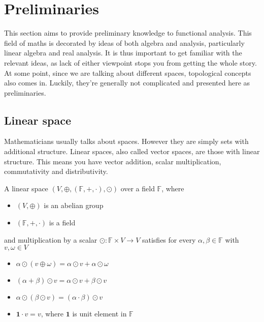 \newpage

\section{Preliminaries}\label{vector space defs}
This section aims to provide preliminary knowledge to functional analysis. This field of maths is decorated by ideas of both algebra and analysis, particularly linear algebra and real analysis. It is thus important to get familiar with the relevant ideas, as lack of either viewpoint stops you from getting the whole story. At some point, since we are talking about different spaces, topological concepts also comes in. Luckily, they're generally not complicated and presented here as preliminaries.
\subsection{Linear space}
Mathematicians usually talks about spaces. However they are simply sets with additional structure. Linear spaces, also called vector spaces, are those with linear structure. This means you have vector addition, scalar multiplication, commutativity and distributivity.
\begin{definition}\rm\nextline
	A linear space $(V,\oplus,(\mathbb{F},+,\cdot),\odot)$ over a field $\mathbb{F}$, where
	\begin{itemize}
		\item $(V,\oplus)$ is an abelian group
		\item $(\mathbb{F},+,\cdot)$ is a field
	\end{itemize}
	and multiplication by a scalar $\odot:\mathbb{F}\times V\xrightarrow{}V$ satisfies for every $\alpha,\beta\in\mathbb{F}$ with $v,\omega\in V$
	\begin{itemize}
		\item $\alpha\odot(v\oplus\omega)=\alpha\odot v+\alpha\odot\omega$
		\item $(\alpha+\beta)\odot v=\alpha\odot v+\beta\odot v$
		\item $\alpha\odot(\beta\odot v)=(\alpha\cdot\beta)\odot v$
		\item $\mathbf{1}\cdot v=v$, where $\mathbf{1}$ is unit element in $\mathbb{F}$
	\end{itemize}
\end{definition}
